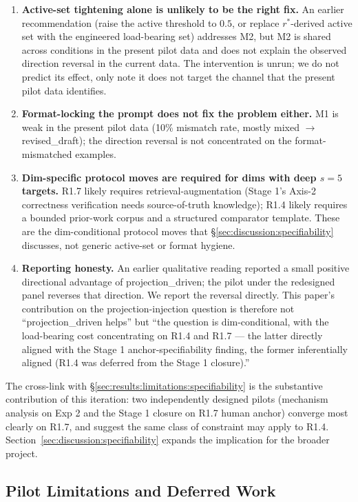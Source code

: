 \begin{enumerate}
    \item \textbf{Active-set tightening alone is unlikely to be the right fix.} An earlier recommendation (raise the active threshold to $0.5$, or replace $r^*$-derived active set with the engineered load-bearing set) addresses M2, but M2 is shared across conditions in the present pilot data and does not explain the observed direction reversal in the current data. The intervention is unrun; we do not predict its effect, only note it does not target the channel that the present pilot data identifies.
    \item \textbf{Format-locking the prompt does not fix the problem either.} M1 is weak in the present pilot data (10\% mismatch rate, mostly mixed $\to$ revised\_draft); the direction reversal is not concentrated on the format-mismatched examples.
    \item \textbf{Dim-specific protocol moves are required for dims with deep $s = 5$ targets.} R1.7 likely requires retrieval-augmentation (Stage 1's Axis-2 correctness verification needs source-of-truth knowledge); R1.4 likely requires a bounded prior-work corpus and a structured comparator template. These are the dim-conditional protocol moves that \S\ref{sec:discussion:specifiability} discusses, not generic active-set or format hygiene.
    \item \textbf{Reporting honesty.} An earlier qualitative reading reported a small positive directional advantage of projection\_driven; the pilot under the redesigned panel reverses that direction. We report the reversal directly. This paper's contribution on the projection-injection question is therefore not ``projection\_driven helps'' but ``the question is dim-conditional, with the load-bearing cost concentrating on R1.4 and R1.7 --- the latter directly aligned with the Stage 1 anchor-specifiability finding, the former inferentially aligned (R1.4 was deferred from the Stage 1 closure).''
\end{enumerate}

The cross-link with \S\ref{sec:results:limitations:specifiability} is the substantive contribution of this iteration: two independently designed pilots (mechanism analysis on Exp 2 and the Stage 1 closure on R1.7 human anchor) converge most clearly on R1.7, and suggest the same class of constraint may apply to R1.4. Section~\ref{sec:discussion:specifiability} expands the implication for the broader project.


\subsection{Pilot Limitations and Deferred Work}
\label{sec:results:limitations}


